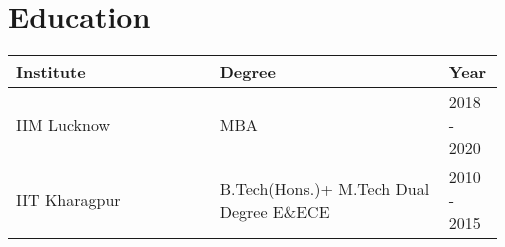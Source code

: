 \section{Education}
\raggedleft
\begin{tabularx}{.97\textwidth}{|>{\centering\arraybackslash}p{0.40\linewidth}|>{\centering\arraybackslash}p{0.45\linewidth}|>{\centering\arraybackslash}p{0.117\linewidth}|}
    \hline
    \rowcolor[gray]{0.9}
    \small Institute & \small Degree & \small Year \\
    \hline
    \small IIM Lucknow & \small MBA & \small 2018 - 2020 \\
    \hline
    \small IIT Kharagpur & \small B.Tech(Hons.)+ M.Tech Dual Degree E\&ECE & \small 2010 - 2015 \\
    \hline
\end{tabularx}